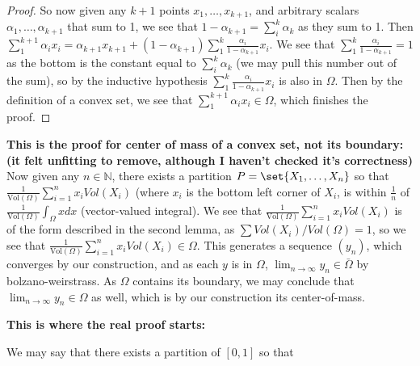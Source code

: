 \documentclass[12pt]{article}
\def\mbb#1{\mathbb{#1}}
\def\bN{\mbb{N}}
\theoremstyle{definition}
\theoremstyle{remark}
\newcommand{\Vol}{\mathrm{Vol}}
\begin{document}
\begin{enumerate}[leftmargin=\labelsep]
\begin{proof}
		So now given any $k+1$ points $x_1, \ldots, x_{k+1}$, and arbitrary scalars $\alpha_1, \ldots, \alpha_{k+1}$ that sum to 1, we see that $1 - \alpha_{k+1} = \sum_i^k \alpha_k$ as they sum to 1. Then $\sum_1^{k+1} \alpha_ix_i = \alpha_{k+1}x_{k+1} + (1-\alpha_{k+1}) \sum_1^k \frac{\alpha_i}{1-\alpha_{k+1}}x_i$. We see that $\sum_1^k \frac{\alpha_i}{1-\alpha_{k+1}} = 1$ as the bottom is the constant equal to $\sum_i^k \alpha_k$ (we may pull this number out of the sum), so by the inductive hypothesis $\sum_1^k \frac{\alpha_i}{1-\alpha_{k+1}}x_i$ is also in $\Omega$. Then by the definition of a convex set, we see that $\sum_1^{k+1} \alpha_ix_i \in \Omega$, which finishes the proof.
	\end{proof}

	\textbf{This is the proof for center of mass of a convex set, not its boundary: (it felt unfitting to remove, although I haven't checked it's correctness)}
	Now given any $n \in \bN$, there exists a partition $P = \set{X_1, \ldots, X_n}$ so that $\frac{1}{\mathrm{Vol}(\Omega)}\sum_{i=1}^{n} x_i Vol(X_i)$ (where $x_i$ is the bottom left corner of $X_i$, is within $\frac 1n$ of $\frac1{\Vol(\Omega)} \int_\Omega xdx$ (vector-valued integral). We see that $\frac{1}{\mathrm{Vol}(\Omega)}\sum_{i=1}^{n} x_i Vol(X_i)$ is of the form described in the second lemma, as $\sum Vol(X_i)/Vol(\Omega) = 1$, so we see that $\frac{1}{\mathrm{Vol}(\Omega)}\sum_{i=1}^{n} x_i Vol(X_i) \in \Omega$. This generates a sequence $(y_n)$, which converges by our construction, and as each $y$ is in $\Omega$, $\lim_{n \to \infty} y_n \in \bar{\Omega}$ by bolzano-weirstrass. As $\Omega$ contains its boundary, we may conclude that $\lim_{n \to \infty} y_n \in \Omega$ as well, which is by our construction its center-of-mass.
	
	\textbf{This is where the real proof starts:}
	
	We may say that there exists a partition of $[0, 1]$ so that
	

\end{enumerate}
\end{document}

